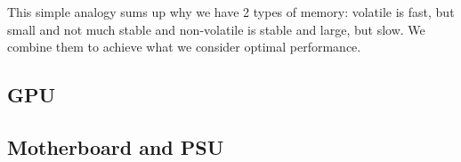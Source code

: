\documentclass[../../what-is-computer.tex]{subfiles}
\begin{document}
        This simple analogy sums up why we have 2 types of memory: volatile is fast, but small and not much stable and non-volatile is stable and large, but slow. We combine them to achieve what we
        consider optimal performance.

    \subsection{GPU}\label{subsection:gpu}
    \subsection{Motherboard and PSU}\label{subsection:motherboard-and-psu}
\end{document}
